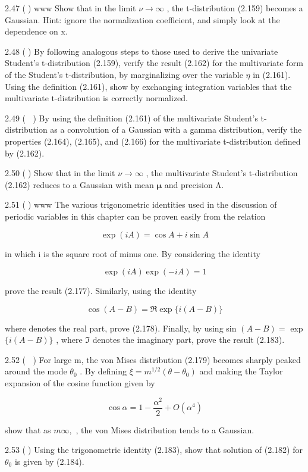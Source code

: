 \documentclass[
  10
]{article}
\begin{document}
2.47 () www Show that in the limit \(\nu \to \infty\) , the
t-distribution (2.159) becomes a Gaussian. Hint: ignore the
normalization coefficient, and simply look at the dependence on x.

2.48 () By following analogous steps to those used to derive the
univariate Student's t-distribution (2.159), verify the result (2.162)
for the multivariate form of the Student's t-distribution, by
marginalizing over the variable \(\eta\) in (2.161). Using the
definition (2.161), show by exchanging integration variables that the
multivariate t-distribution is correctly normalized.

2.49 ( ) By using the definition (2.161) of the multivariate Student's
t-distribution as a convolution of a Gaussian with a gamma distribution,
verify the properties (2.164), (2.165), and (2.166) for the multivariate
t-distribution defined by (2.162).

2.50 () Show that in the limit \(\nu \to \infty\) , the multivariate
Student's t-distribution (2.162) reduces to a Gaussian with mean
\(\pmb { \mu }\) and precision Λ.

2.51 () www The various trigonometric identities used in the discussion
of periodic variables in this chapter can be proven easily from the
relation

\[
\exp (i A) = \cos A + i \sin A\tag{2.296}
\]

in which i is the square root of minus one. By considering the identity

\[
\exp (i A) \exp (- i A) = 1\tag{2.297}
\]

prove the result (2.177). Similarly, using the identity

\[
\cos (A - B) = \Re \exp \{i (A - B) \}\tag{2.298}
\]

where denotes the real part, prove (2.178). Finally, by using sin
\(( A - B ) =\) exp \(\{ i ( A - B ) \}\) , where \(\Im\) denotes the
imaginary part, prove the result (2.183).

2.52 ( ) For large m, the von Mises distribution (2.179) becomes sharply
peaked around the mode \(\theta _ { 0 }\) . By defining
\(\xi = m ^ { 1 / 2 } ( \theta - \theta _ { 0 } )\) and making the
Taylor expansion of the cosine function given by

\[
\cos \alpha = 1 - \frac {\alpha^ {2}}{2} + O (\alpha^ {4})\tag{2.299}
\]

show that as \(m  \infty ,\) , the von Mises distribution tends to a
Gaussian.

2.53 () Using the trigonometric identity (2.183), show that solution of
(2.182) for \(\theta _ { 0 }\) is given by (2.184).
\end{document}
